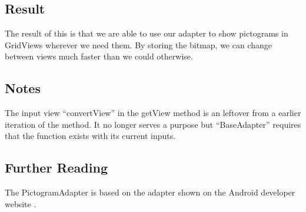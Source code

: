 \subsection*{Result}
The result of this is that we are able to use our adapter to show pictograms in GridViews wherever we need them.
By storing the bitmap, we can change between views much faster than we could otherwise.


\subsection*{Notes}
The input view ``convertView'' in the getView method is an leftover from a earlier iteration of the method. It no longer serves a purpose but ``BaseAdapter'' requires that the function exists with its current inputs.\\

\subsection*{Further Reading}

The PictogramAdapter is based on the adapter shown on the Android developer website \cite{gridview}.